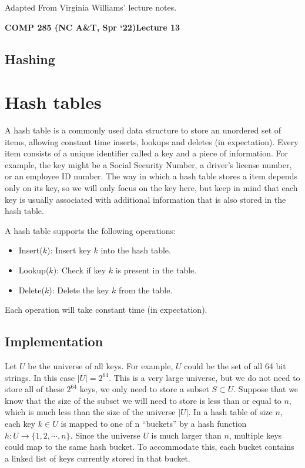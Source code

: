 \documentclass [12pt]{article}
\begin{document}
 

\vspace {1em} 
\begin {Instruction} 
Adapted From Virginia Williams' lecture notes.
\end {Instruction}  

{\LARGE \textbf {COMP 285 (NC A\&T, Spr `22)}\hfill \textbf {Lecture 13} } 

\begin{centering}
\section*{Hashing}
\end{centering}

\section{Hash tables}
A hash table is a commonly used data structure to store an unordered set of items, allowing constant time inserts, lookups and deletes (in expectation). Every item consists of a unique identifier called a key and a piece of information. For example, the key might be a Social Security Number, a driver's license number, or an employee ID number. The way in which a hash table stores a item depends only on its key, so we will only focus on the key here, but keep in mind that each key is usually associated with additional information that is also stored in the hash table.

A hash table supports the following operations:
\begin{itemize}
  \item Insert($k$): Insert key $k$ into the hash table.
  \item Lookup($k$): Check if key $k$ is present in the table.
  \item Delete($k$): Delete the key $k$ from the table.
\end{itemize}
Each operation will take constant time (in expectation).

\subsection{Implementation}
Let $U$ be the universe of all keys. For example, $U$ could be the set of all 64 bit strings. In this case $|U| = 2^64$. This is a very large universe, but we do not need to store all of these $2^64$ keys, we only need to store a subset $S \subset U$. Suppose that we know that the size of the subset we will need to store is less than or equal to $n$, which is much less than the size of the universe $|U|$. In a hash table of size $n$, each key  $k \in U$ is mapped to one of n ``buckets'' by a hash function $h : U \to \{1, 2, \cdots , n\}$. Since the universe $U$ is much larger than $n$, multiple
keys could map to the same hash bucket. To accommodate this, each bucket contains a linked list of keys currently stored in that bucket.
\end{document}
